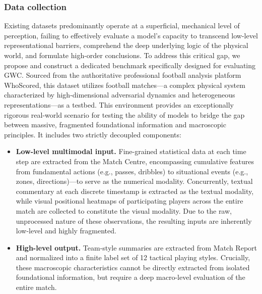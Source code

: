 \subsubsection{Data collection}
Existing datasets predominantly operate at a superficial, mechanical level of perception, failing to effectively evaluate a model's capacity to transcend low-level representational barriers, comprehend the deep underlying logic of the physical world, and formulate high-order conclusions. To address this critical gap, we propose and construct a dedicated benchmark specifically designed for evaluating GWC. Sourced from the authoritative professional football analysis platform WhoScored, this dataset utilizes football matches—a complex physical system characterized by high-dimensional adversarial dynamics and heterogeneous representations—as a testbed. This environment provides an exceptionally rigorous real-world scenario for testing the ability of models to bridge the gap between massive, fragmented foundational information and macroscopic principles. It includes two strictly decoupled components:
\begin{itemize}
    \item \textbf{Low-level multimodal input.} Fine-grained statistical data at each time step are extracted from the Match Centre, encompassing cumulative features from fundamental actions (e.g., passes, dribbles) to situational events (e.g., zones, directions)—to serve as the numerical modality. Concurrently, textual commentary at each discrete timestamp is extracted as the textual modality, while visual positional heatmaps of participating players across the entire match are collected to constitute the visual modality. Due to the raw, unprocessed nature of these observations, the resulting inputs are inherently low-level and highly fragmented.
    \item \textbf{High-level output.} Team-style summaries are extracted from Match Report and normalized into a finite label set of 12 tactical playing styles. Crucially, these macroscopic characteristics cannot be directly extracted from isolated foundational information, but require a deep macro-level evaluation of the entire match.
\end{itemize}



